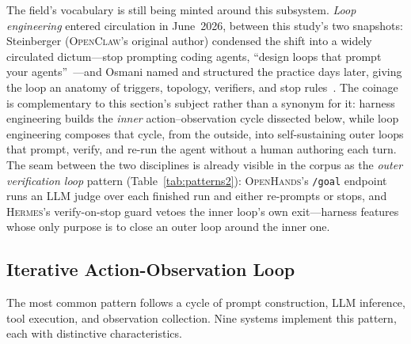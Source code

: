 \documentclass[11pt,a4paper]{article}
\newcommand{\oh}{\textsc{OpenHands}\xspace}
\newcommand{\ocl}{\textsc{OpenClaw}\xspace}
\newcommand{\hrm}{\textsc{Hermes}\xspace}
\begin{document}
The field's vocabulary is still being minted around this subsystem.
\emph{Loop engineering} entered circulation in June~2026, between this study's two snapshots: Steinberger (\ocl{}'s original author) condensed the shift into a widely circulated dictum---stop prompting coding agents, ``design loops that prompt your agents''~\cite{steinberger2026loops}---and Osmani named and structured the practice days later, giving the loop an anatomy of triggers, topology, verifiers, and stop rules~\cite{osmani2026loop}.
The coinage is complementary to this section's subject rather than a synonym for it: harness engineering builds the \emph{inner} action--observation cycle dissected below, while loop engineering composes that cycle, from the outside, into self-sustaining outer loops that prompt, verify, and re-run the agent without a human authoring each turn.
The seam between the two disciplines is already visible in the corpus as the \emph{outer verification loop} pattern (Table~\ref{tab:patterns2}): \oh{}'s \texttt{/goal} endpoint runs an LLM judge over each finished run and either re-prompts or stops, and \hrm{}'s verify-on-stop guard vetoes the inner loop's own exit---harness features whose only purpose is to close an outer loop around the inner one.

\subsection{Iterative Action-Observation Loop}

The most common pattern follows a cycle of prompt construction, LLM inference, tool execution, and observation collection.
Nine systems implement this pattern, each with distinctive characteristics.
\end{document}
